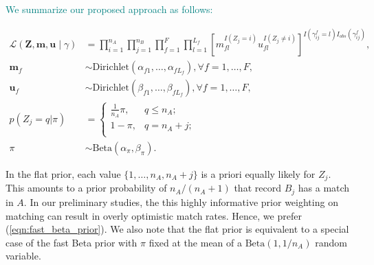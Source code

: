 \documentclass[ba]{imsart}
\begin{document}

\textcolor{teal}{We summarize our proposed approach as follows:} 

\begin{subequations}
\begin{align}
	\mathcal{L}(\bm{Z}, \bm{m}, \bm{u} \mid \gamma) &= \prod_{i=1}^{n_A}  \prod_{j=1}^{n_B}\prod_{f=1}^{F}\prod_{l=1}^{L_f}\left[  m_{fl}^{I(Z_j = i)}u_{fl}^{I(Z_j \neq i)}\right]^{I(\gamma_{ij}^f = l)I_{obs}(\gamma_{ij}^f)}, \label{eqn:likelihood}\\
	\bm{m}_f &\sim \text{Dirichlet}(\alpha_{f1}, \ldots, \alpha_{f L_f}), \forall f = 1, \ldots, F, \label{eqn:m} \\
	\bm{u}_f &\sim \text{Dirichlet}(\beta_{f1}, \ldots, \beta_{f L_f}),\forall f = 1, \ldots, F,  \label{eqn:u}\\
	p(Z_j = q| \pi)  &=
	\begin{cases} 
		\frac{1}{n_A}\pi,  & q \leq n_A; \\
		1-\pi, &  q  = n_A + j; \\
	\end{cases} \label{eqn:z}\\
	\pi &\sim \text{Beta}(\alpha_{\pi}, \beta_{\pi})\label{eqn:pi}.
\end{align}
\end{subequations}

\begin{remark}
In the \cite{wortman2019} flat prior, each value $\{1, \ldots, n_A, n_A +j\}$ is a priori equally likely for $Z_j$. This amounts to a prior probability of $n_A / (n_A + 1)$ that record $B_j$ has a match in $A$. In our preliminary studies, the this highly informative prior weighting on matching can result in overly optimistic match rates. Hence, we prefer (\ref{eqn:fast_beta_prior}). We also note that the flat prior is equivalent to a special case of the fast Beta prior with $\pi$ fixed at the mean of a $\text{Beta}\left(1, 1 / n_A \right)$ random variable.
\end{remark}
\end{document}
